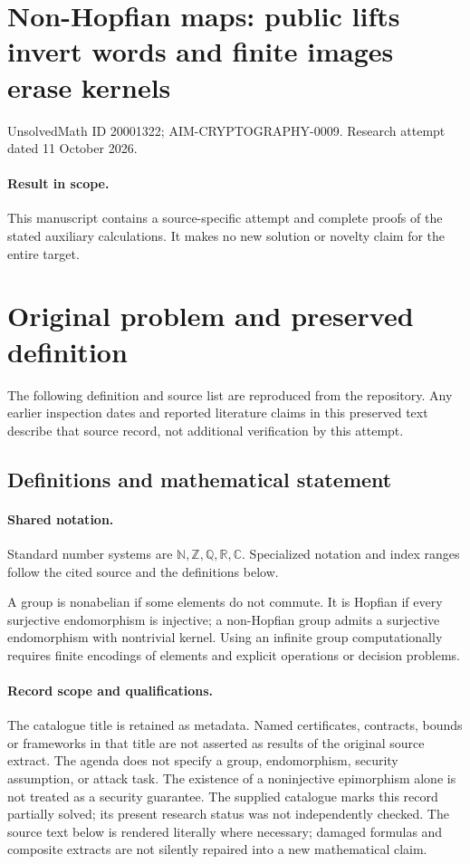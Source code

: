 \documentclass[11pt]{article}
\begin{document}
\section*{Non-Hopfian maps: public lifts invert words and finite images erase kernels}
\noindent UnsolvedMath ID 20001322; AIM-CRYPTOGRAPHY-0009. Research attempt dated 11 October 2026.
\paragraph{Result in scope.}This manuscript contains a source-specific attempt and complete proofs of the stated auxiliary calculations. It makes no new solution or novelty claim for the entire target.
\section{Original problem and preserved definition}
The following definition and source list are reproduced from the repository. Any earlier inspection dates and reported literature claims in this preserved text describe that source record, not additional verification by this attempt.
\subsection{Definitions and mathematical statement}

\paragraph{Shared notation.}Standard number systems are $\mathbb N,\mathbb Z,\mathbb Q,\mathbb R,\mathbb C$. Specialized notation and index ranges follow the cited source and the definitions below.


A group is nonabelian if some elements do not commute. It is Hopfian if every surjective endomorphism is injective; a non-Hopfian group admits a surjective endomorphism with nontrivial kernel. Using an infinite group computationally requires finite encodings of elements and explicit operations or decision problems.
\paragraph{Record scope and qualifications.}
The catalogue title is retained as metadata. Named certificates, contracts, bounds or frameworks in that title are not asserted as results of the original source extract.
The agenda does not specify a group, endomorphism, security assumption, or attack task. The existence of a noninjective epimorphism alone is not treated as a security guarantee. The supplied catalogue marks this record partially solved; its present research status was not independently checked.
The source text below is rendered literally where necessary; damaged formulas and composite extracts are not silently repaired into a new mathematical claim.
\end{document}
